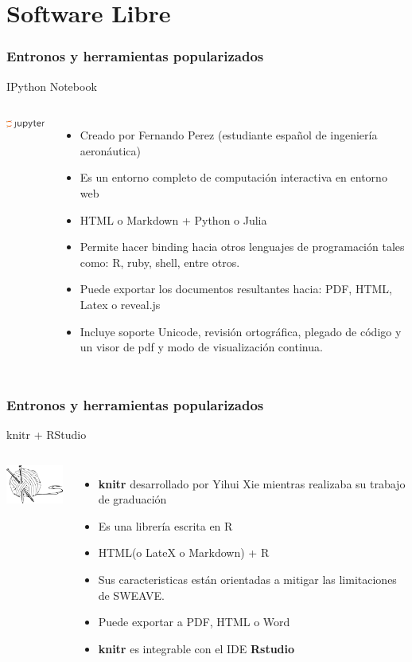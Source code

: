\documentclass[sans serif,9pt,xcolor=dvipsnames]{beamer}%
\begin{document}
\section{Software Libre}
\begin{frame}
\frametitle {Entronos y herramientas popularizados}
\justifying
\begin{block}{IPython Notebook}
\begin{columns}
 \hspace{0.7cm}
\includegraphics[width=2.2cm]{imagenes/jupyter.png} 
\begin{itemize}
\justifying
\item Creado por Fernando Perez (estudiante español de ingeniería aeronáutica)
\item Es un entorno completo de computación interactiva en entorno web
\item HTML o Markdown + Python o Julia
\item Permite hacer binding hacia otros lenguajes de programación tales como: R, ruby, shell, entre otros.
\item Puede exportar los documentos resultantes hacia: PDF, HTML, Latex o reveal.js 
\item Incluye soporte Unicode, revisión ortográfica, plegado de código y un visor de pdf y modo de visualización continua.
\end{itemize}
\end{columns}
\end{block}
\end{frame}

\begin{frame}
\frametitle {Entronos y herramientas popularizados}
\justifying
\begin{block}{knitr + RStudio}
\begin{columns}
 \hspace{0.7cm}
\includegraphics[width=2.3cm]{imagenes/knitr.png} 
\begin{itemize}
\justifying
\item \textbf{knitr} desarrollado por Yihui Xie mientras realizaba su trabajo de graduación
\item Es una librería escrita en R
\item HTML(o LateX o Markdown) + R 
\item Sus caracteristicas están orientadas a mitigar las limitaciones de SWEAVE.
\item Puede exportar a PDF, HTML o Word
\item \textbf{knitr} es integrable con el IDE \textbf{Rstudio}
\end{itemize}
\end{columns}
\end{block}
\end{frame}
\end{document}
